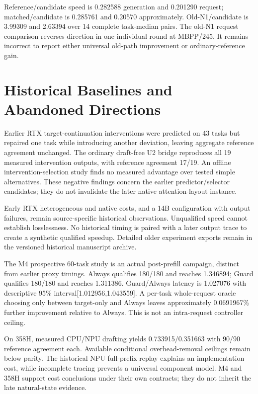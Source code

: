 Reference/candidate speed is 0.282588 generation and 0.201290 request; matched/candidate is 0.285761 and 0.20570 approximately. Old-N1/candidate is 3.99309 and 2.63394 over 14 complete task-median pairs. The old-N1 request comparison reverses direction in one individual round at MBPP/245. It remains incorrect to report either universal old-path improvement or ordinary-reference gain.

\section{Historical Baselines and Abandoned Directions}
Earlier RTX target-continuation interventions were predicted on 43 tasks but repaired one task while introducing another deviation, leaving aggregate reference agreement unchanged. The ordinary draft-free U2 bridge reproduces all 19 measured intervention outputs, with reference agreement 17/19. An offline intervention-selection study finds no measured advantage over tested simple alternatives. These negative findings concern the earlier predictor/selector candidates; they do not invalidate the later native attention-layout instance.

Early RTX heterogeneous and native costs, and a 14B configuration with output failures, remain source-specific historical observations. Unqualified speed cannot establish losslessness. No historical timing is paired with a later output trace to create a synthetic qualified speedup. Detailed older experiment exports remain in the versioned historical manuscript archive.

The M4 prospective 60-task study is an actual post-prefill campaign, distinct from earlier proxy timings. Always qualifies 180/180 and reaches 1.346894; Guard qualifies 180/180 and reaches 1.311386. Guard/Always latency is 1.027076 with descriptive 95\% interval[1.012956,1.043559]. A per-task whole-request oracle choosing only between target-only and Always leaves approximately 0.0691967\% further improvement relative to Always. This is not an intra-request controller ceiling.

On 358H, measured CPU/NPU drafting yields 0.733915/0.351663 with 90/90 reference agreement each. Available conditional overhead-removal ceilings remain below parity. The historical NPU full-prefix replay explains an implementation cost, while incomplete tracing prevents a universal component model. M4 and 358H support cost conclusions under their own contracts; they do not inherit the late natural-state evidence.


